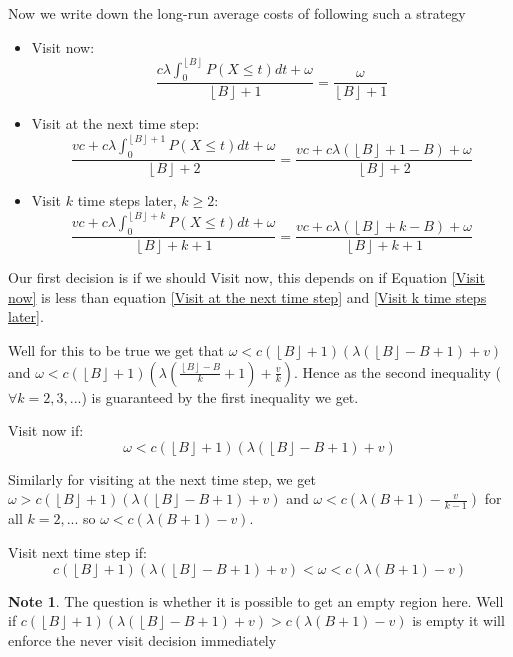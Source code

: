 \documentclass[a4paper,10pt]{article}
\newcommand{\floor}[1]{\left \lfloor #1 \right \rfloor}
\theoremstyle{definition}
\theoremstyle{definition}
\theoremstyle{remark}
\theoremstyle{definition}
\newtheorem*{note}{Note}
\begin{document}
Now we write down the long-run average costs of following such a strategy
\begin{itemize}
\item Visit now:
\begin{equation}
\label{Visit now}
\frac{c \lambda \int_{0}^{\floor{B}} P(X \leq t)dt +\omega}{\floor{B}+1}
=\frac{\omega}{\floor{B}+1}
\end{equation}
\item Visit at the next time step:
\begin{equation}
\label{Visit at the next time step}
\frac{vc+ c \lambda \int_{0}^{\floor{B}+1} P(X \leq t)dt+ \omega}{\floor{B}+2}
=\frac{vc + c \lambda (\floor{B}+1-B) + \omega}{\floor{B}+2}
\end{equation}
\item Visit $k$ time steps later, $k \geq 2$:
\begin{equation}
\label{Visit k time steps later}
\frac{vc+ c \lambda \int_{0}^{\floor{B}+k} P(X \leq t)dt+ \omega}{\floor{B}+k+1}
=\frac{vc + c \lambda (\floor{B}+k-B) + \omega}{\floor{B}+k+1}
\end{equation}
\end{itemize}

Our first decision is if we should Visit now, this depends on if Equation \ref{Visit now} is less than equation \ref{Visit at the next time step} and \ref{Visit k time steps later}.

Well for this to be true we get that $\omega < c(\floor{B}+1)(\lambda (\floor{B}-B+1) +v)$ and $\omega< c (\floor{B}+1)(\lambda (\frac{\floor{B}-B}{k}+1)+\frac{v}{k})$. Hence as the second inequality ($\forall k=2,3,...$) is guaranteed by the first inequality we get.

Visit now if:
\begin{equation}
\omega < c (\floor{B}+1) (\lambda (\floor{B}-B+1) +v)
\end{equation}

Similarly for visiting at the next time step, we get $\omega > c(\floor{B}+1)(\lambda (\floor{B}-B+1) +v)$ and $\omega < c (\lambda (B+1) - \frac{v}{k-1})$ for all $k=2,...$ so $\omega < c (\lambda (B+1) -v)$.

Visit next time step if:
\begin{equation}
c(\floor{B}+1)(\lambda (\floor{B}-B+1) +v)< \omega < c (\lambda (B+1) -v)
\end{equation}

\begin{note}
The question is whether it is possible to get an empty region here. Well if $c(\floor{B}+1)(\lambda (\floor{B}-B+1) +v) > c (\lambda (B+1) -v)$ is empty it will enforce the never visit decision immediately
\end{note}
\end{document}
